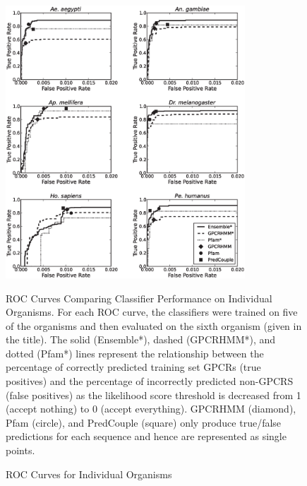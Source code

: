 \begin{figure}[H]
  \centering
  \caption{ROC Curves for Individual Organisms}
\includegraphics[width=0.8\textwidth]{figures/gpcr_classifier/organism_ensembl_roc.eps}

ROC Curves Comparing Classifier Performance on Individual Organisms.  For each ROC curve, the classifiers were trained on five of the organisms and then evaluated on the sixth organism (given in the title).  The solid (Ensemble*), dashed (GPCRHMM*), and dotted (Pfam*) lines represent the relationship between the percentage of correctly predicted training set GPCRs (true positives) and the percentage of incorrectly predicted non-GPCRS (false positives) as the likelihood score threshold is decreased from 1 (accept nothing) to 0 (accept everything).  GPCRHMM (diamond), Pfam (circle), and PredCouple (square) only produce true/false predictions for each sequence and hence are represented as single points.
\label{fig:individual-roc-curves}
\end{figure}

